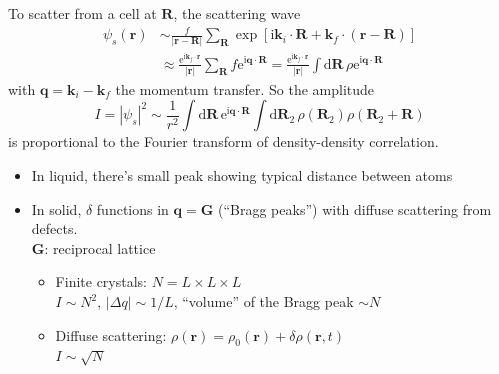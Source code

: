\documentclass[11pt,letterpaper]{article}
\numberwithin{equation}{section} %
\renewcommand*{\vec}[1]{\bm{#1}}
\newcommand{\dif}{\mathrm d}
\newcommand\mi{\mathrm{i}}
\newcommand\e{\mathrm{e}}
\begin{document}
To scatter from a cell at $\vec R$, the scattering wave
\begin{align}
	\psi_s(\vec r) &\sim \frac{f}{|\vec r - \vec R|}\sum_{\vec R}\exp \left[
	\mi\vec k_i\cdot\vec R + \vec k_f\cdot(\vec r - \vec R)\right] \\
	&\approx \frac{\e^{\mi\vec k_f\cdot\vec r}}{|\vec r|}\sum_{\vec R} 
	f\e^{\mi\vec q\cdot\vec R}
	= \frac{\e^{\mi\vec k_f\cdot\vec r}}{|\vec r|}\int\dif\vec R \, \rho\e^{\mi
	\vec q \cdot\vec R}
\end{align}
with $\vec q = \vec k_i - \vec k_f$ the momentum transfer. So the amplitude 
\begin{equation}
	I = |\psi_s|^2 \sim \frac 1{r^2}\int\dif\vec R\,\e^{\mi\vec q \cdot\vec R} 
	\int\dif\vec R_2\,\rho(\vec R_2)\rho(\vec R_2+\vec R)
\end{equation}
is proportional to the Fourier transform of density-density correlation. 
\begin{itemize}
	\item In liquid, there's small peak showing typical distance between
		atoms
	\item In solid, $\delta$ functions in $\vec q=\vec G$ (``Bragg peaks'') with
		diffuse scattering from defects. \\
		$\vec G$: reciprocal lattice
		\begin{itemize}
			\item Finite crystals: $N = L\times L\times L$ \\
				$I\sim N^2$, $|\Delta q| \sim 1/L$, ``volume'' of the Bragg
				peak $\sim N$
			\item Diffuse scattering: $\rho(\vec r) = \rho_0(\vec r) + \delta
				\rho(\vec r, t)$\\
				$I\sim \sqrt{N}$
		\end{itemize}
\end{itemize}
\end{document}

